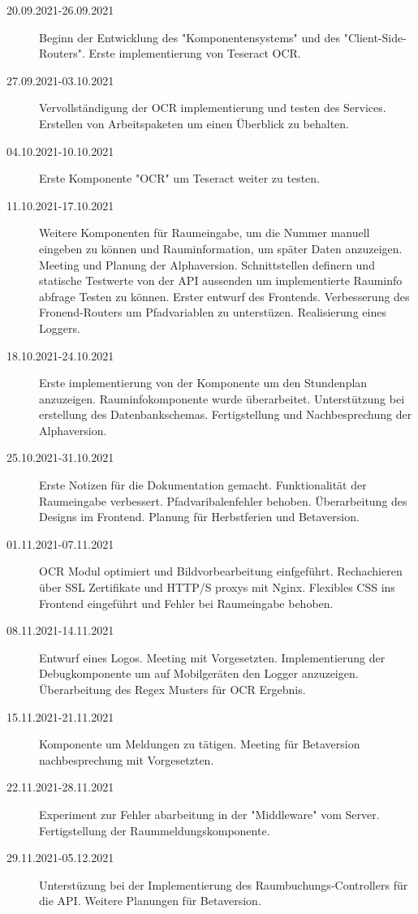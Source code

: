 
\begin{description}
    \item[20.09.2021-26.09.2021]Beginn der Entwicklung des "Komponentensystems" und des "Client-Side-Routers". Erste implementierung von Teseract OCR. 
    \item[27.09.2021-03.10.2021] Vervollständigung der OCR implementierung und testen des Services. Erstellen von Arbeitspaketen um einen Überblick zu behalten.
    \item[04.10.2021-10.10.2021] Erste Komponente "OCR" um Teseract weiter zu testen.
    \item[11.10.2021-17.10.2021] Weitere Komponenten für Raumeingabe, um die Nummer manuell eingeben zu können und Rauminformation, um später Daten anzuzeigen. Meeting und Planung der Alphaversion. Schnittstellen definern und statische Testwerte von der API aussenden um implementierte Rauminfo abfrage Testen zu können. Erster entwurf des Frontends. Verbesserung des Fronend-Routers um Pfadvariablen zu unterstüzen. Realisierung eines Loggers.
    \item[18.10.2021-24.10.2021] Erste implementierung von der Komponente um den Stundenplan anzuzeigen. Rauminfokomponente wurde überarbeitet. Unterstützung bei erstellung des Datenbankschemas. Fertigstellung und Nachbesprechung der Alphaversion.
    \item[25.10.2021-31.10.2021] Erste Notizen für die Dokumentation gemacht. Funktionalität der Raumeingabe verbessert. Pfadvaribalenfehler behoben. Überarbeitung des Designs im Frontend. Planung für Herbstferien und Betaversion.
    \item[01.11.2021-07.11.2021] OCR Modul optimiert und Bildvorbearbeitung einfgeführt. Rechachieren über SSL Zertifikate und HTTP/S proxys mit Nginx. Flexibles CSS ins Frontend eingeführt und Fehler bei Raumeingabe behoben.
    \item[08.11.2021-14.11.2021] Entwurf eines Logos. Meeting mit Vorgesetzten. Implementierung der Debugkomponente um auf Mobilgeräten den Logger anzuzeigen. Überarbeitung des Regex Musters für OCR Ergebnis.
    \item[15.11.2021-21.11.2021] Komponente um Meldungen zu tätigen. Meeting für Betaversion nachbesprechung mit Vorgesetzten. 
    \item[22.11.2021-28.11.2021] Experiment zur Fehler abarbeitung in der "Middleware" vom Server. Fertigstellung der Raummeldungskomponente.
    \item[29.11.2021-05.12.2021] Unterstüzung bei der Implementierung des Raumbuchungs-Controllers für die API. Weitere Planungen für Betaversion.

\end{description}
